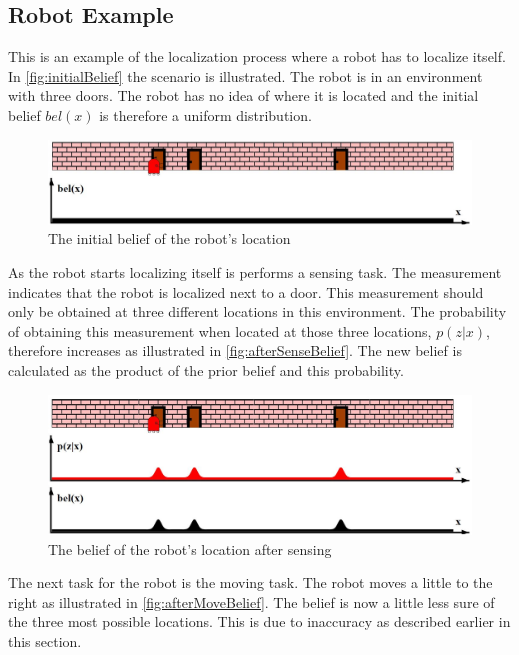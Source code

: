 \subsection{Robot Example} %
\label{sub:robot_example}

This is an example of the localization process where a robot has to localize itself. In \autoref{fig:initialBelief} the scenario is illustrated. The robot is in an environment with three doors. The robot has no idea of where it is located and the initial belief $bel(x)$ is therefore a uniform distribution.

\begin{figure}[H]
\centering
\includegraphics[scale=0.36]{images/MarkovLocalizationA}
\caption{The initial belief of the robot's location}
\label{fig:initialBelief}
\end{figure}

As the robot starts localizing itself is performs a sensing task. The measurement indicates that the robot is localized next to a door. This measurement should only be obtained at three different locations in this environment. The probability of obtaining this measurement when located at those three locations, $p(z|x)$, therefore increases as illustrated in \autoref{fig:afterSenseBelief}. The new belief is calculated as the product of the prior belief and this probability.

\begin{figure}[H]
\centering
\includegraphics[scale=0.36]{images/MarkovLocalizationB}
\caption{The belief of the robot's location after sensing}
\label{fig:afterSenseBelief}
\end{figure}

The next task for the robot is the moving task. The robot moves a little to the right as illustrated in \autoref{fig:afterMoveBelief}. The belief is now a little less sure of the three most possible locations. This is due to inaccuracy as described earlier in this section.

